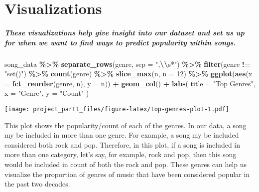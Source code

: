 \documentclass[
]{article}
\newenvironment{Shaded}{\begin{snugshade}}{\end{snugshade}}
\newcommand{\AttributeTok}[1]{\textcolor[rgb]{0.13,0.29,0.53}{#1}}
\newcommand{\DecValTok}[1]{\textcolor[rgb]{0.00,0.00,0.81}{#1}}
\newcommand{\FunctionTok}[1]{\textcolor[rgb]{0.13,0.29,0.53}{\textbf{#1}}}
\newcommand{\NormalTok}[1]{#1}
\newcommand{\SpecialCharTok}[1]{\textcolor[rgb]{0.81,0.36,0.00}{\textbf{#1}}}
\newcommand{\StringTok}[1]{\textcolor[rgb]{0.31,0.60,0.02}{#1}}
\begin{document}
\hypertarget{visualizations}{%
\section{Visualizations}\label{visualizations}}

\hypertarget{these-visualizations-help-give-insight-into-our-dataset-and-set-us-up-for-when-we-want-to-find-ways-to-predict-popularity-within-songs.}{%
\subparagraph{These visualizations help give insight into our dataset
and set us up for when we want to find ways to predict popularity within
songs.}\label{these-visualizations-help-give-insight-into-our-dataset-and-set-us-up-for-when-we-want-to-find-ways-to-predict-popularity-within-songs.}}

\begin{Shaded}
\begin{Highlighting}[]
\NormalTok{song\_data }\SpecialCharTok{\%\textgreater{}\%} 
  \FunctionTok{separate\_rows}\NormalTok{(genre, }\AttributeTok{sep =} \StringTok{",}\SpecialCharTok{\textbackslash{}\textbackslash{}}\StringTok{s*"}\NormalTok{) }\SpecialCharTok{\%\textgreater{}\%}
  \FunctionTok{filter}\NormalTok{(genre }\SpecialCharTok{!=} \StringTok{"set()"}\NormalTok{) }\SpecialCharTok{\%\textgreater{}\%}
  \FunctionTok{count}\NormalTok{(genre) }\SpecialCharTok{\%\textgreater{}\%}
  \FunctionTok{slice\_max}\NormalTok{(n, }\AttributeTok{n =} \DecValTok{12}\NormalTok{) }\SpecialCharTok{\%\textgreater{}\%}
  \FunctionTok{ggplot}\NormalTok{(}\FunctionTok{aes}\NormalTok{(}\AttributeTok{x =} \FunctionTok{fct\_reorder}\NormalTok{(genre, n), }\AttributeTok{y =}\NormalTok{ n)) }\SpecialCharTok{+}
  \FunctionTok{geom\_col}\NormalTok{() }\SpecialCharTok{+}
  \FunctionTok{labs}\NormalTok{(}
    \AttributeTok{title =} \StringTok{"Top Genres"}\NormalTok{,}
    \AttributeTok{x =} \StringTok{"Genre"}\NormalTok{,}
    \AttributeTok{y =} \StringTok{"Count"}
\NormalTok{  )}
\end{Highlighting}
\end{Shaded}

\texttt{[image: project\_part1\_files/figure-latex/top-genres-plot-1.pdf]}

This plot shows the popularity/count of each of the genres. In our data,
a song my be included in more than one genre. For example, a song my be
included considered both rock and pop. Therefore, in this plot, if a
song is included in more than one category, let's say, for example, rock
and pop, then this song would be included in count of both the rock and
pop. These genres can help us visualize the proportion of genres of
music that have been considered popular in the past two decades.
\end{document}
